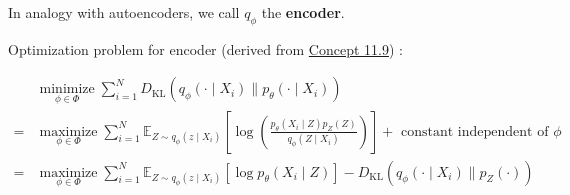 \documentclass{report}
\begin{document}
\begin{concept}
    In analogy with autoencoders, we call $q_{\phi}$ the \textbf{encoder}.

    Optimization problem for encoder (derived from \hyperref[concept:11.9]{Concept 11.9}) :

    $$
    \begin{aligned}
    & \underset{\phi \in \Phi}{\operatorname{minimize}} \sum_{i=1}^{N} D_{\mathrm{KL}}\left(q_{\phi}\left(\cdot \mid X_{i}\right) \| p_{\theta}\left(\cdot \mid X_{i}\right)\right) \\
    = & \underset{\phi \in \Phi}{\operatorname{maximize}} \sum_{i=1}^{N} \mathbb{E}_{Z \sim q_{\phi}\left(z \mid X_{i}\right)}\left[\log \left(\frac{p_{\theta}\left(X_{i} \mid Z\right) p_{Z}(Z)}{q_{\phi}\left(Z \mid X_{i}\right)}\right)\right]+\text { constant independent of } \phi \\
    = & \underset{\phi \in \Phi}{\operatorname{maximize}} \sum_{i=1}^{N} \mathbb{E}_{Z \sim q_{\phi}\left(z \mid X_{i}\right)}\left[\log p_{\theta}\left(X_{i} \mid Z\right)\right]-D_{\mathrm{KL}}\left(q_{\phi}\left(\cdot \mid X_{i}\right) \| p_{Z}(\cdot)\right)
    \end{aligned}
    $$
\end{concept}
\end{document}
